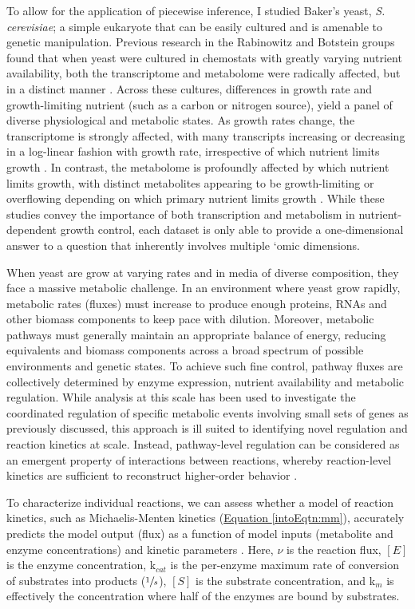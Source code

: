 To allow for the application of piecewise inference, I studied Baker's yeast, \textit{S. cerevisiae}; a simple eukaryote that can be easily cultured and is amenable to genetic manipulation. Previous research in the Rabinowitz and Botstein groups found that when yeast were cultured in chemostats with greatly varying nutrient availability, both the transcriptome and metabolome were radically affected, but in a distinct manner \cite{Brauer:2008jn, Boer:2010fb}. Across these cultures, differences in growth rate and growth-limiting nutrient (such as a carbon or nitrogen source), yield a panel of diverse physiological and metabolic states. As growth rates change, the transcriptome is strongly affected, with many transcripts increasing or decreasing in a log-linear fashion with growth rate, irrespective of which nutrient limits growth \cite{Brauer:2008jn}. In contrast, the metabolome is profoundly affected by which nutrient limits growth, with distinct metabolites appearing to be growth-limiting or overflowing depending on which primary nutrient limits growth \cite{Boer:2010fb}. While these studies convey the importance of both transcription and metabolism in nutrient-dependent growth control, each dataset is only able to provide a one-dimensional answer to a question that inherently involves multiple `omic dimensions.

When yeast are grow at varying rates and in media of diverse composition, they face a massive metabolic challenge. In an environment where yeast grow rapidly, metabolic rates (fluxes) must increase to produce enough  proteins, RNAs and other biomass components to keep pace with dilution.  Moreover, metabolic pathways must generally maintain an appropriate balance of energy, reducing equivalents and biomass components across a broad spectrum of possible environments and genetic states. To achieve such fine control, pathway fluxes are collectively determined by enzyme expression, nutrient availability and metabolic regulation.  While analysis at this scale has been used to investigate the coordinated regulation of specific metabolic events involving small sets of genes \cite{Zampar:2013fr, Link:2013dj} as previously discussed, this approach is ill suited to identifying novel regulation and reaction kinetics at scale. Instead, pathway-level regulation can be considered as an emergent property of interactions between reactions, whereby reaction-level kinetics are sufficient to reconstruct higher-order behavior \cite{Fell:1997wg}.

To characterize individual reactions, we can assess whether a model of reaction kinetics, such as Michaelis-Menten kinetics (\hyperref[intoEqtn:mm]{Equation \ref{intoEqtn:mm}}), accurately predicts the model output (flux) as a function of model inputs (metabolite and enzyme concentrations) and kinetic parameters \cite{Anonymous:1913wn, Liebermeister:2006fm, Tummler:2014cp}. Here, $\nu$ is the reaction flux, $\left[E\right]$ is the enzyme concentration, k$_{cat}$ is the per-enzyme maximum rate of conversion of substrates into products ($\sfrac{1}{s}$), $\left[S\right]$ is the substrate concentration, and k$_{m}$ is effectively the concentration where half of the enzymes are bound by substrates.

